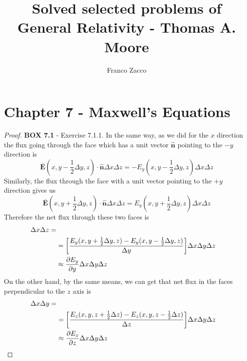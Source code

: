 \documentclass[11pt]{article}
\title{\textbf{Solved selected problems of General Relativity - Thomas A. Moore}}
\author{Franco Zacco}
\date{}
\newcommand{\hatn}{\bm{\hat{n}}}
\theoremstyle{definition}
\begin{document}
\maketitle
\thispagestyle{empty}

\section*{Chapter 7 - Maxwell's Equations}

\begin{proof}{\textbf{BOX 7.1} - Exercise 7.1.1.}
    In the same way, as we did for the $x$ direction the flux going through 
    the face which has a unit vector $\hatn$ pointing to the $-y$ direction is
    $$\bm{\bar{E}}(x, y - \frac{1}{2}\Delta y, z) \cdot \hatn \Delta x \Delta z
    = -E_y(x, y - \frac{1}{2}\Delta y, z)\Delta x \Delta z$$
    Similarly, the flux through the face with a unit vector pointing to the $+y$
    direction gives us
    $$\bm{\bar{E}}(x, y + \frac{1}{2}\Delta y, z) \cdot \hatn \Delta x \Delta z
    = E_y(x, y + \frac{1}{2}\Delta y, z)\Delta x \Delta z$$
    Therefore the net flux through these two faces is
    \begin{align*}
        [E_y(x, y + \frac{1}{2}\Delta y, z)&-E_y(x, y - \frac{1}{2}\Delta y, z)]
        \Delta x \Delta z
        =\\
        &=\bigg[\frac{E_y(x, y + \frac{1}{2}\Delta y, z)
         - E_y(x, y - \frac{1}{2}\Delta y, z)}{\Delta y}\bigg]
        \Delta x \Delta y\Delta z\\
        &\approx \partialderivative{E_y}{y} \Delta x \Delta y\Delta z
    \end{align*}
    On the other hand, by the same means, we can get that net flux in the faces
    perpendicular to the $z$ axis is
    \begin{align*}
        [E_z(x, y, z+ \frac{1}{2}\Delta z)&-E_z(x, y, z - \frac{1}{2}\Delta z)]
        \Delta x \Delta y
        =\\
        &=\bigg[\frac{E_z(x, y, z + \frac{1}{2}\Delta z)
         - E_z(x, y, z- \frac{1}{2}\Delta z)}{\Delta z}\bigg]
        \Delta x \Delta y\Delta z\\
        &\approx \partialderivative{E_z}{z} \Delta x \Delta y\Delta z
    \end{align*}
\end{proof}
\cleardoublepage
\end{document}
